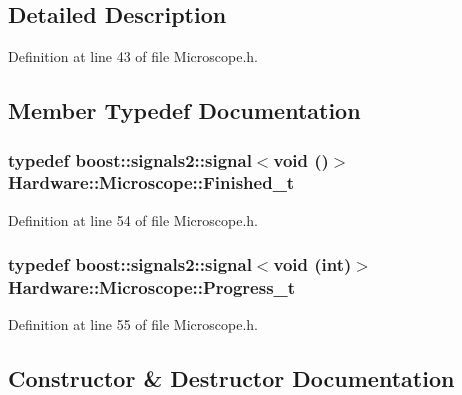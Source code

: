 \subsection{Detailed Description}


Definition at line 43 of file Microscope.\+h.



\subsection{Member Typedef Documentation}
\hypertarget{class_hardware_1_1_microscope_a062b6c7876e05cc311a54bd85da459b2}{}
\subsubsection[{Finished\+\_\+t}]{\setlength{\rightskip}{0pt plus 5cm}typedef boost\+::signals2\+::signal$<$void ()$>$ {\bf Hardware\+::\+Microscope\+::\+Finished\+\_\+t}}\label{class_hardware_1_1_microscope_a062b6c7876e05cc311a54bd85da459b2}


Definition at line 54 of file Microscope.\+h.

\hypertarget{class_hardware_1_1_microscope_a5288928044551054276042c402c5a6a1}{}
\subsubsection[{Progress\+\_\+t}]{\setlength{\rightskip}{0pt plus 5cm}typedef boost\+::signals2\+::signal$<$void (int)$>$ {\bf Hardware\+::\+Microscope\+::\+Progress\+\_\+t}}\label{class_hardware_1_1_microscope_a5288928044551054276042c402c5a6a1}


Definition at line 55 of file Microscope.\+h.



\subsection{Constructor \& Destructor Documentation}
\hypertarget{class_hardware_1_1_microscope_a335599c313acd6f5e2f94c09a3475620}{}
